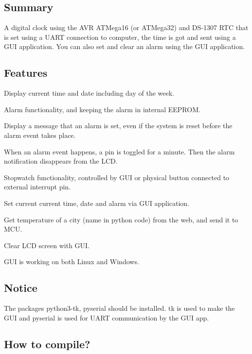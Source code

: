 \subsection*{Summary}

A digital clock using the A\+VR A\+T\+Mega16 (or A\+T\+Mega32) and D\+S-\/1307 R\+TC that is set using a U\+A\+RT connection to computer, the time is got and sent using a G\+UI application. You can also set and clear an alarm using the G\+UI application.

\subsection*{Features}


\begin{DoxyItemize}
\item Display current time and date including day of the week.
\item Alarm functionality, and keeping the alarm in internal E\+E\+P\+R\+OM.
\item Display a message that an alarm is set, even if the system is reset before the alarm event takes place.
\item When an alarm event happens, a pin is toggled for a minute. Then the alarm notification disappears from the L\+CD.
\item Stopwatch functionality, controlled by G\+UI or physical button connected to external interrupt pin.
\item Set current current time, date and alarm via G\+UI application.
\item Get temperature of a city (name in python code) from the web, and send it to M\+CU.
\item Clear L\+CD screen with G\+UI.
\item G\+UI is working on both Linux and Windows.
\end{DoxyItemize}

\subsection*{Notice}

The packages {\ttfamily python3-\/tk}, {\ttfamily pyserial} should be installed. tk is used to make the G\+UI and pyserial is used for U\+A\+RT communication by the G\+UI app.

\subsection*{How to compile?}

